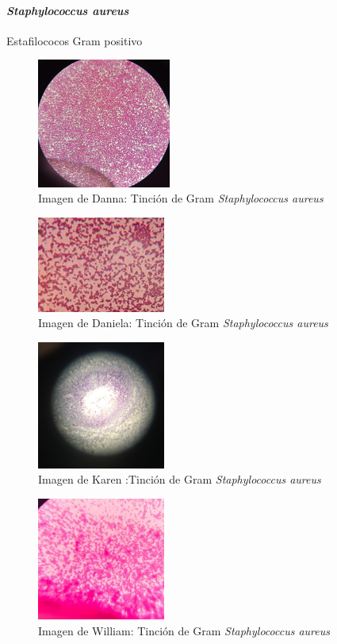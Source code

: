 \documentclass[journal,transmag]{IEEEtran}
\begin{document}
\paragraph{\large \textit{\textbf{Staphylococcus aureus}}} Estafilococos Gram positivo
	\begin{figure}[!h] 
	\center 
	\includegraphics[width=4.4cm]{I3.png} 
	\caption{Imagen de Danna: Tinción de Gram \textit{Staphylococcus aureus} } 
	\label{I1}
	\end{figure} 
	\begin{figure}[!h] 
	\center 
	\includegraphics[width=4.2cm]{I7.jpg} 
	\caption{Imagen de Daniela: Tinción de Gram \textit{Staphylococcus aureus} } 
	\label{I1}
	\end{figure} 
	\begin{figure}[!h] 
	\center 
	\includegraphics[width=4.2cm]{I11.png} 
	\caption{Imagen de Karen :Tinción de Gram \textit{Staphylococcus aureus} } 
	\label{I1}
	\end{figure} 
	\begin{figure}[!h] 
	\center 
	\includegraphics[width=4.2cm]{I15.jpg} 
	\caption{Imagen de William: Tinción de Gram \textit{Staphylococcus aureus} } 
	\label{I1}
	\end{figure} 
\vspace{50mm} 
\end{document}
